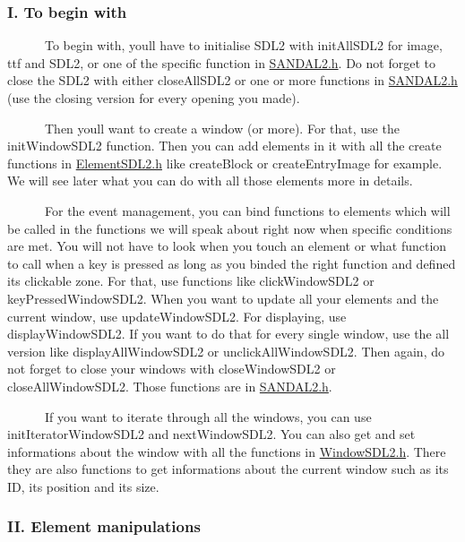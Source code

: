 \subsubsection*{I. To begin with}

~~~~~~To begin with, you\textquotesingle{}ll have to initialise S\+D\+L2 with init\+All\+S\+D\+L2 for image, ttf and S\+D\+L2, or one of the specific function in \hyperlink{SANDAL2_8h}{S\+A\+N\+D\+A\+L2.\+h}. Do not forget to close the S\+D\+L2 with either close\+All\+S\+D\+L2 or one or more functions in \hyperlink{SANDAL2_8h}{S\+A\+N\+D\+A\+L2.\+h} (use the closing version for every opening you made).

~~~~~~Then you\textquotesingle{}ll want to create a window (or more). For that, use the init\+Window\+S\+D\+L2 function. Then you can add elements in it with all the create functions in \hyperlink{ElementSDL2_8h}{Element\+S\+D\+L2.\+h} like create\+Block or create\+Entry\+Image for example. We will see later what you can do with all those elements more in details.

~~~~~~For the event management, you can bind functions to elements which will be called in the functions we will speak about right now when specific conditions are met. You will not have to look when you touch an element or what function to call when a key is pressed as long as you binded the right function and defined its clickable zone. For that, use functions like click\+Window\+S\+D\+L2 or key\+Pressed\+Window\+S\+D\+L2. When you want to update all your elements and the current window, use update\+Window\+S\+D\+L2. For displaying, use display\+Window\+S\+D\+L2. If you want to do that for every single window, use the \textquotesingle{}all\textquotesingle{} version like display\+All\+Window\+S\+D\+L2 or unclick\+All\+Window\+S\+D\+L2. Then again, do not forget to close your windows with close\+Window\+S\+D\+L2 or close\+All\+Window\+S\+D\+L2. Those functions are in \hyperlink{SANDAL2_8h}{S\+A\+N\+D\+A\+L2.\+h}.

~~~~~~If you want to iterate through all the windows, you can use init\+Iterator\+Window\+S\+D\+L2 and next\+Window\+S\+D\+L2. You can also get and set informations about the window with all the functions in \hyperlink{WindowSDL2_8h}{Window\+S\+D\+L2.\+h}. There they are also functions to get informations about the current window such as its ID, its position and its size.

\subsubsection*{II. Element manipulations}

